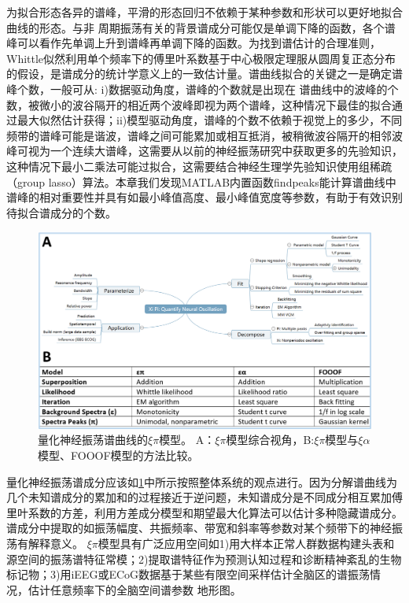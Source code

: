 为拟合形态各异的谱峰，平滑的形态回归不依赖于某种参数和形状可以更好地拟合曲线的形态。与非
周期振荡有关的背景谱成分可能仅是单调下降的函数，各个谱峰可以看作先单调上升到谱峰再单调下降的函数。为找到谱估计的合理准则，Whittle似然利用单个频率下的傅里叶系数基于中心极限定理服从圆周复正态分布的假设，是谱成分的统计学意义上的一致估计量。谱曲线拟合的关键之一是确定谱峰个数，一般可从: i)数据驱动角度，谱峰的个数就是出现在
谱曲线中的波峰的个数，被微小的波谷隔开的相近两个波峰即视为两个谱峰，这种情况下最佳的拟合通过最大似然估计获得；ii)模型驱动角度，谱峰的个数不依赖于视觉上的多少，不同频带的谱峰可能是谐波，谱峰之间可能累加或相互抵消，被稍微波谷隔开的相邻波峰可视为一个连续大谱峰，这需要从以前的神经振荡研究中获取更多的先验知识，这种情况下最小二乘法可能过拟合，这需要结合神经生理学先验知识使用组稀疏（group lasso）算法。本章我们发现MATLAB内置函数findpeaks能计算谱曲线中谱峰的相对重要性并具有如最小峰值高度、最小峰值宽度等参数，有助于有效识别待拟合谱成分的个数。

\begin{figure}[!h]
\includegraphics[width=15cm]{pic/xipi/model.png}
\caption{量化神经振荡谱曲线的$\xi\pi$模型。 A：$\xi\pi$模型综合视角，B:$\xi\pi$模型与$\xi\alpha$模型、FOOOF模型的方法比较。}
\label{7:model}
\end{figure}

量化神经振荡谱成分应该如\ref{7:model}中所示按照整体系统的观点进行。因为分解谱曲线为几个未知谱成分的累加和的过程接近于逆问题，未知谱成分是不同成分相互累加傅里叶系数的方差，利用方差成分模型和期望最大化算法可以估计多种隐藏谱成分。谱成分中提取的如振荡幅度、共振频率、带宽和斜率等参数对某个频带下的神经振荡有解释意义。
$\xi\pi$模型具有广泛应用空间如1)用大样本正常人群数据构建头表和源空间的振荡谱特征常模；2)提取谱特征作为预测认知过程和诊断精神紊乱的生物标记物；3)用iEEG或ECoG数据基于某些有限空间采样估计全脑区的谱振荡情况，估计任意频率下的全脑空间谱参数
地形图。

